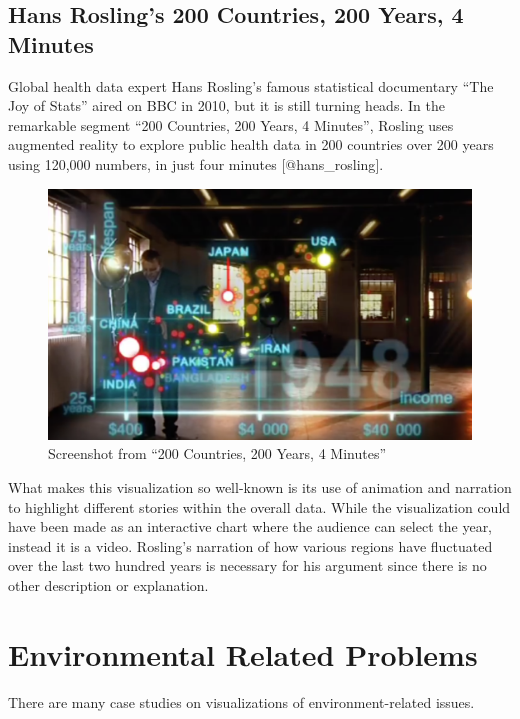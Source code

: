 \documentclass[]{book}
\theoremstyle{definition}
\theoremstyle{definition}
\theoremstyle{definition}
\theoremstyle{remark}
\begin{document}
\subsection{Hans Rosling's 200 Countries, 200 Years, 4
Minutes}\label{hans-roslings-200-countries-200-years-4-minutes}

Global health data expert Hans Rosling's famous statistical documentary
``The Joy of Stats'' aired on BBC in 2010, but it is still turning
heads. In the remarkable segment ``200 Countries, 200 Years, 4
Minutes'', Rosling uses augmented reality to explore public health data
in 200 countries over 200 years using 120,000 numbers, in just four
minutes {[}@hans\_rosling{]}.

\begin{figure}
\centering
\includegraphics{images/200_countries_years.png}
\caption{Screenshot from ``200 Countries, 200 Years, 4 Minutes''}
\end{figure}

What makes this visualization so well-known is its use of animation and
narration to highlight different stories within the overall data. While
the visualization could have been made as an interactive chart where the
audience can select the year, instead it is a video. Rosling's narration
of how various regions have fluctuated over the last two hundred years
is necessary for his argument since there is no other description or
explanation.

\section{Environmental Related
Problems}\label{environmental-related-problems}

There are many case studies on visualizations of environment-related
issues.
\end{document}
